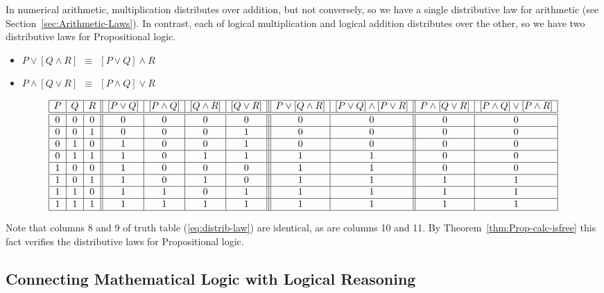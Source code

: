 \noindent
In numerical arithmetic, multiplication distributes over addition, but
not conversely, so we have a single distributive law for arithmetic
(see Section~\ref{sec:Arithmetic-Laws}).  In contrast, each of logical
multiplication and logical addition distributes over the other, so we
have two distributive laws for Propositional logic.
\begin{itemize}
\item
$ P \vee [ Q \wedge R] \ \ \equiv \ \ [P \vee Q] \wedge R$
\item
$P \wedge [ Q \vee R] \ \ \equiv \ \ [P \wedge Q] \vee R$
\end{itemize}
{\small
\begin{equation}
\label{eq:distrib-law}
\begin{array}{|c|c|c||c|c|c|c|||c|c||c|c|}
\hline
P & Q & R
  & [P \vee Q]
  & [P \wedge Q]
  & [Q \wedge R] 
  & [Q \vee R] 
  & P \vee [ Q \wedge R]
  & [P \vee Q] \wedge [P \vee R]
  & P \wedge [ Q \vee R]
  & [P \wedge Q] \vee [P \wedge R] \\
\hline
\hline
0 & 0 & 0
  & 0
  & 0
  & 0
  & 0
  & 0
  & 0
  & 0
  & 0 \\ 
\hline
0 & 0 & 1
  & 0
  & 0
  & 0
  & 1
  & 0
  & 0
  & 0 
  & 0 \\
\hline
0 & 1 & 0
  & 1
  & 0
  & 0
  & 1
  & 0
  & 0
  & 0
  & 0 \\
\hline
0 & 1 & 1
  & 1
  & 0
  & 1
  & 1
  & 1
  & 1
  & 0
  & 0 \\
\hline
1 & 0 & 0
  & 1
  & 0
  & 0
  & 0
  & 1
  & 1
  & 0
  & 0 \\
\hline
1 & 0 & 1
  & 1
  & 0
  & 1
  & 0
  & 1
  & 1
  & 1
  & 1 \\
\hline
1 & 1 & 0
  & 1
  & 1
  & 0
  & 1
  & 1
  & 1
  & 1
  & 1 \\
\hline
1 & 1 & 1
  & 1
  & 1
  & 1
  & 1
  & 1
  & 1
  & 1
  & 1 \\
\hline
\end{array}
\end{equation}
}

Note that columns 8 and 9 of truth table (\ref{eq:distrib-law}) are
identical, as are columns 10 and 11.  By
Theorem~\ref{thm:Prop-calc-isfree} this fact verifies the distributive
laws for Propositional logic.


\subsection{Connecting Mathematical Logic with Logical
  Reasoning}
\label{sec:practical-logic}

